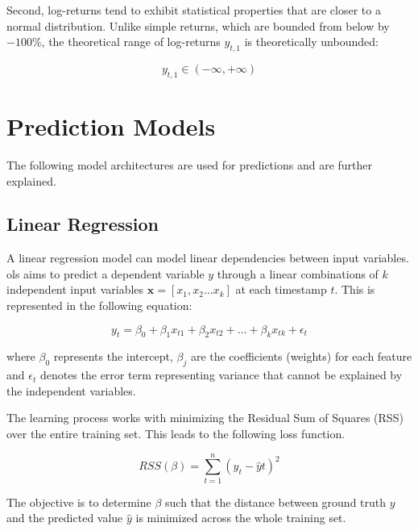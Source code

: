 \documentclass[12pt,twoside=false,a4paper,parskip]{scrbook}
\begin{document}
 
Second, log-returns tend to exhibit statistical properties that are closer to a normal distribution. Unlike simple returns, which are bounded from below by $-100\%$, the theoretical range of log-returns  $y_{t,1}$ is theoretically unbounded:

\begin{equation}
y_{t,1} \in (-\infty, +\infty)
\end{equation}



\section{Prediction Models}

The following model architectures are used for predictions and are further explained.


\subsection{Linear Regression}

A linear regression model can model linear dependencies between input variables. \gls{ols} aims to predict a dependent variable $y$ through a linear combinations of $k$ independent input variables $\mathbf{x} = [x_1, x_2 ... x_k]$ at each timestamp $t$. This is represented in the following equation:

\begin{equation}y_t = \beta_0 + \beta_1 x_{t1} + \beta_2 x_{t2} + \dots + \beta_k x_{tk} + \epsilon_t
\end{equation}

where $\beta_0$ represents the intercept, $\beta_j$ are the coefficients (weights) for each feature and $\epsilon_t$ denotes the error term representing variance that cannot be explained by the independent variables.


The learning process works with minimizing the Residual Sum of Squares (RSS) over the entire training set. This leads to the following loss function.

\begin{equation} RSS(\beta) = \sum_{t=1}^{n} (y_t - \hat{y}t)^2
\end{equation}


The objective is to determine $\beta$ such that the distance between ground truth $y$ and the predicted value $\hat{y}$ is minimized across the whole training set. 
\end{document}
